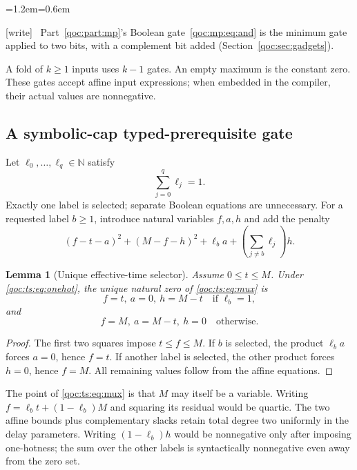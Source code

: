 \documentclass[11pt,letterpaper]{article}
\newtheorem{lemma}[theorem]{Lemma}
\theoremstyle{definition}
\theoremstyle{remark}
\newcommand{\N}{\mathbb N}
\newcommand{\wtag}{\textup{[write]}}
\newenvironment{writenote}{\par\smallskip\begin{list}{}{\leftmargin=1.2em\rightmargin=0.6em}\item[]\small\wtag\ }{\end{list}\smallskip}
\begin{document}
\begin{writenote}
Part~\ref{qoc:part:mp}'s Boolean gate~\eqref{qoc:mp:eq:and} is the minimum gate applied to two bits, with a complement bit added (Section~\ref{qoc:sec:gadgets}).
\end{writenote}
A fold of $k\ge1$ inputs uses $k-1$ gates. An empty maximum is the
constant zero. These gates accept affine input expressions; when embedded
in the compiler, their actual values are nonnegative.

\subsection{A symbolic-cap typed-prerequisite gate}
Let $\ell_0,\ldots,\ell_q\in\N$ satisfy
\begin{equation}\label{qoc:ts:eq:onehot}
 \sum_{j=0}^q\ell_j=1.
\end{equation}
Exactly one label is selected; separate Boolean equations are unnecessary.
For a requested label $b\ge1$, introduce natural variables $f,a,h$ and
add the penalty
\begin{equation}\label{qoc:ts:eq:mux}
 (f-t-a)^2+(M-f-h)^2+
 \ell_ba+\left(\sum_{j\ne b}\ell_j\right)h.
\end{equation}

\begin{lemma}[Unique effective-time selector]\label{qoc:ts:lem:mux}
Assume $0\le t\le M$. Under \eqref{qoc:ts:eq:onehot}, the unique natural zero
of \eqref{qoc:ts:eq:mux} is
\[
 f=t,\ a=0,\ h=M-t\quad\text{if }\ell_b=1,
\]
and
\[
 f=M,\ a=M-t,\ h=0\quad\text{otherwise}.
\]
\end{lemma}
\begin{proof}
The first two squares impose $t\le f\le M$. If $b$ is selected, the
product $\ell_ba$ forces $a=0$, hence $f=t$. If another label is selected,
the other product forces $h=0$, hence $f=M$. All remaining values follow
from the affine equations.
\end{proof}

The point of \eqref{qoc:ts:eq:mux} is that $M$ may itself be a variable. Writing
$f=\ell_b t+(1-\ell_b)M$ and squaring its residual would be quartic.
The two affine bounds plus complementary slacks retain total degree two
uniformly in the delay parameters. Writing $(1-\ell_b)h$ would be
nonnegative only after imposing one-hotness; the sum over the other
labels is syntactically nonnegative even away from the zero set.
\end{document}
